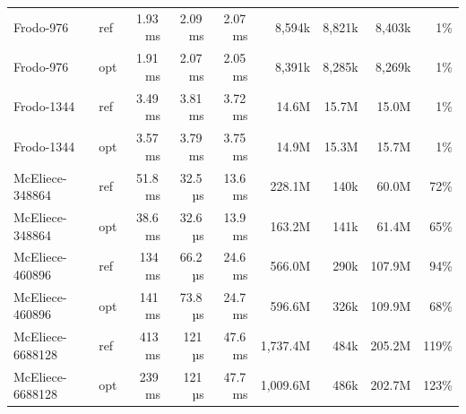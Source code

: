 \begin{tabular}{llrrrrrrr}
Frodo-976 & ref & 1.93\,ms & 2.09\,ms & 2.07\,ms & 8,594k & 8,821k & 8,403k & 1\% \\
Frodo-976 & opt & 1.91\,ms & 2.07\,ms & 2.05\,ms & 8,391k & 8,285k & 8,269k & 1\% \\
Frodo-1344 & ref & 3.49\,ms & 3.81\,ms & 3.72\,ms & 14.6M & 15.7M & 15.0M & 1\% \\
Frodo-1344 & opt & 3.57\,ms & 3.79\,ms & 3.75\,ms & 14.9M & 15.3M & 15.7M & 1\% \\
\midrule
McEliece-348864 & ref & 51.8\,ms & 32.5\,µs & 13.6\,ms & 228.1M & 140k & 60.0M & 72\% \\
McEliece-348864 & opt & 38.6\,ms & 32.6\,µs & 13.9\,ms & 163.2M & 141k & 61.4M & 65\% \\
McEliece-460896 & ref & 134\,ms & 66.2\,µs & 24.6\,ms & 566.0M & 290k & 107.9M & 94\% \\
McEliece-460896 & opt & 141\,ms & 73.8\,µs & 24.7\,ms & 596.6M & 326k & 109.9M & 68\% \\
McEliece-6688128 & ref & 413\,ms & 121\,µs & 47.6\,ms & 1,737.4M & 484k & 205.2M & 119\% \\
McEliece-6688128 & opt & 239\,ms & 121\,µs & 47.7\,ms & 1,009.6M & 486k & 202.7M & 123\% \\
\bottomrule
\end{tabular}
